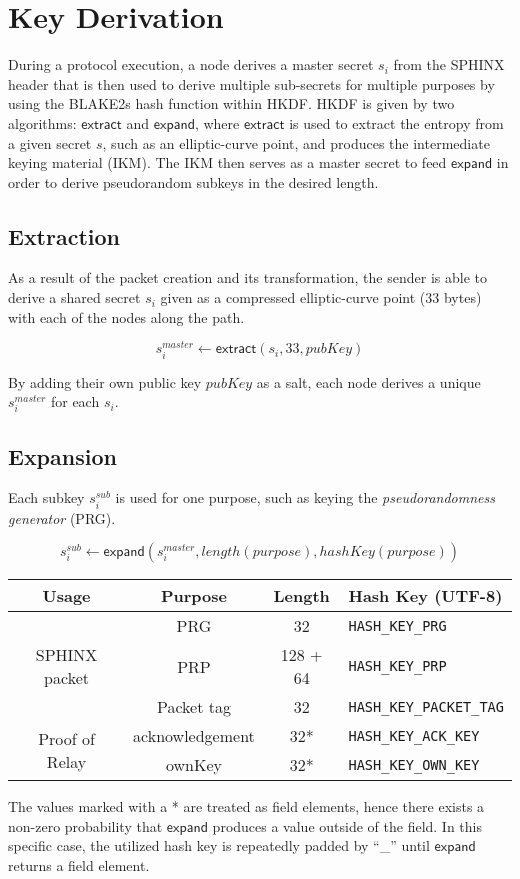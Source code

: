 \section{Key Derivation}
\label{appendix:keyderivation}

During a protocol execution, a node derives a master secret $s_i$ from the SPHINX header that is then used to derive multiple sub-secrets for multiple purposes by using the BLAKE2s hash function within HKDF. HKDF is given by two algorithms: $\mathsf{extract}$ and $\mathsf{expand}$, where $\mathsf{extract}$ is used to extract the entropy from a given secret $s$, such as an elliptic-curve point, and produces the intermediate keying material (IKM). The IKM then serves as a master secret to feed $\mathsf{expand}$ in order to derive pseudorandom subkeys in the desired length.

\subsection{Extraction}

As a result of the packet creation and its transformation, the sender is able to derive a shared secret $s_i$ given as a compressed elliptic-curve point (33 bytes) with each of the nodes along the path.

$$s_i^{master} \longleftarrow \mathsf{extract}(s_i, 33, pubKey)$$

By adding their own public key $pubKey$ as a salt, each node derives a unique $s_i^{master}$ for each $s_i$.

\subsection{Expansion}

Each subkey $s_i^{sub}$ is used for one purpose, such as keying the \textit{pseudorandomness generator} (PRG).

$$s_i^{sub} \longleftarrow \mathsf{expand}(s_i^{master}, length(purpose), hashKey(purpose))$$

\begin{center}
    \begin{tabular}{|c | c| c | l |}
        \hline
        Usage                           & Purpose         & Length   & Hash Key (UTF-8)                \\
        \hline
        \hline
        \multirow{3}{*}{SPHINX packet}  & PRG             & 32       & \texttt{HASH\_KEY\_PRG}         \\
                                        & PRP             & 128 + 64 & \texttt{HASH\_KEY\_PRP}         \\
                                        & Packet tag      & 32       & \texttt{HASH\_KEY\_PACKET\_TAG} \\
        \hline
        \multirow{2}{*}{Proof of Relay} & acknowledgement & 32*      & \texttt{HASH\_KEY\_ACK\_KEY}    \\
                                        & ownKey          & 32*      & \texttt{HASH\_KEY\_OWN\_KEY}    \\

        \hline
    \end{tabular}
\end{center}

The values marked with a * are treated as field elements, hence there exists a non-zero probability that $\mathsf{expand}$ produces a value outside of the field. In this specific case, the utilized hash key is repeatedly padded by ``\_'' until $\mathsf{expand}$ returns a field element.
